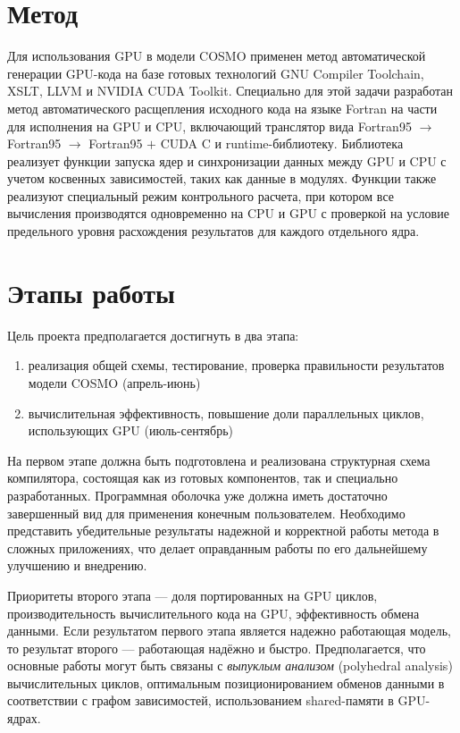 \documentclass[a4,12pt]{report}
\begin{document}
\section{Метод}

Для использования GPU в модели COSMO применен метод автоматической генерации GPU-кода на базе готовых технологий GNU Compiler Toolchain, XSLT, LLVM и NVIDIA CUDA Toolkit. Специально для этой задачи разработан метод автоматического расщепления исходного кода на языке Fortran на части для исполнения на GPU и CPU, включающий транслятор вида Fortran95 $\rightarrow$ Fortran95 $\rightarrow$ Fortran95 $+$ CUDA C и runtime-библиотеку. Библиотека реализует функции запуска ядер и синхронизации данных между GPU и CPU с учетом косвенных зависимостей, таких как данные в модулях. Функции также реализуют специальный режим контрольного расчета, при котором все вычисления производятся одновременно на CPU и GPU с проверкой на условие предельного уровня расхождения результатов для каждого отдельного ядра.

\section{Этапы работы}

Цель проекта предполагается достигнуть в два этапа:
\begin{enumerate}
\item реализация общей схемы, тестирование, проверка правильности результатов модели COSMO (апрель-июнь)
\item вычислительная эффективность, повышение доли параллельных циклов, использующих GPU (июль-сентябрь)
\end{enumerate}
На первом этапе должна быть подготовлена и реализована структурная схема компилятора, состоящая как из готовых компонентов, так и специально разработанных. Программная оболочка уже должна иметь достаточно завершенный вид для применения конечным пользователем. Необходимо представить убедительные результаты надежной и корректной работы метода в сложных приложениях, что делает оправданным работы по его дальнейшему улучшению и внедрению.

Приоритеты второго этапа --- доля портированных на GPU циклов, производительность вычислительного кода на GPU, эффективность обмена данными. Если результатом первого этапа является надежно работающая модель, то результат второго --- работающая надёжно и быстро. Предполагается, что основные работы могут быть связаны с \emph{выпуклым анализом} (polyhedral analysis) вычислительных циклов, оптимальным позиционированием обменов данными в соответствии с графом зависимостей, использованием shared-памяти в GPU-ядрах.
\end{document}
